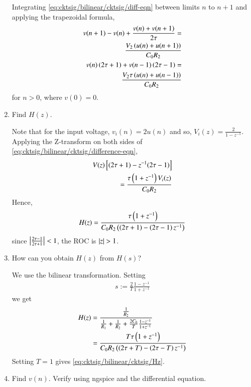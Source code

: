 \documentclass[journal,12pt,twocolumn]{IEEEtran}
\renewcommand\thesection{\arabic{section}}
\begin{document}
\begin{enumerate}[label=\arabic*.,ref=\thesection.\theenumi]
\solution Integrating \eqref{eq:cktsig/bilinear/cktsig/diff-eqn} between limits $n$ to $n+1$ 
and applying the trapezoidal formula,
\begin{align}
    v(n+1) - v(n) + \frac{v(n) + v(n+1)}{2\tau} = \nonumber\\
    \frac{V_2\brak{u(n)+u(n+1)}}{C_0R_2} \\
    v(n)\brak{2\tau+1} + v(n-1)\brak{2\tau-1} = \nonumber\\ 
    \frac{V_2\tau\brak{u(n)+u(n-1)}}{C_0R_2}
    \label{eq:cktsig/bilinear/cktsig/difference-eqn}
\end{align}
for $n > 0$, where $v(0) = 0$.
\item Find $H(z)$.

\solution Note that for the input voltage, $v_i(n) = 2u(n)$ and
so, $V_i(z) = \frac{2}{1-z^{-1}}$. Applying the Z-transform
on both sides of \eqref{eq:cktsig/bilinear/cktsig/difference-eqn},
\begin{align}
    V(z){}\left[(2\tau + 1) - z^{-1}(2\tau - 1)\right] \nonumber \\
    = \frac{\tau\left(1 + z^{-1}\right)V_i(z)}{C_0R_2}
\end{align}
Hence,
\begin{align}
    H(z) = \frac{\tau\brak{1+z^{-1}}}{C_0R_2\brak{\brak{2\tau+1}-\brak{2\tau-1}z^{-1}}}
    \label{eq:cktsig/bilinear/cktsig/Hz}
\end{align}
since $\left\vert\frac{2\tau-1}{2\tau+1}\right\vert < 1$, the ROC is $\left\vert z\right\vert > 1$.
\item How can you obtain $H(z)$ from $H(s)$?

\solution We use the bilinear transformation. Setting
\begin{align}
    s := \frac{2}{T}\frac{1 - z^{-1}}{1 + z^{-1}}
\end{align}
we get
\begin{align}
    H(z) &= \frac{\frac{1}{R_2}}{\frac{1}{R_1} + \frac{1}{R_2} + \frac{2C_0}{T}\frac{1 - z^{-1}}{1 + z^{-1}}} \\
         &= \frac{T\tau\left(1+z^{-1}\right)}{C_0R_2\left(\left(2\tau+T\right)-\left(2\tau-T\right)z^{-1}\right)}
\end{align}
Setting $T = 1$ gives \eqref{eq:cktsig/bilinear/cktsig/Hz}.

\item Find $v(n)$. Verify using ngspice and the differential equation.


\end{enumerate}
\end{document}
